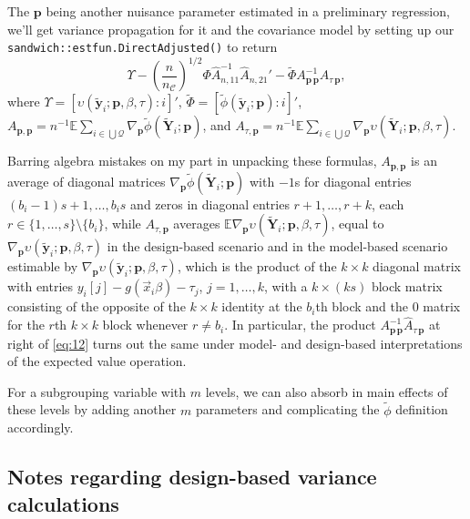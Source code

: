 \documentclass{article}
\begin{document}
The $\mathbf{p}$ being another nuisance parameter estimated in a
preliminary regression, we'll get variance propagation for it and the
covariance model by setting up our
\texttt{sandwich::estfun.DirectAdjusted()} to return
\begin{equation}\label{eq:12}
  \Upsilon -
  \left(\frac{n}{n_{\mathcal{C}}}\right)^{1/2}\Phi
  \hat{A}_{n,11}^{-1}\hat{A}_{n,21}' - \tilde{\Phi}
  A_{\mathbf{p}\,\mathbf{p}}^{-1}\hat{A}_{\tau\,\mathbf{p}}, 
\end{equation}
where $\Upsilon =
[\upsilon(\tilde{\mathbf{y}}_{i}; \mathbf{p}, \beta, \tau) : i]'$,
$\tilde{\Phi}= [\tilde{\phi}(\tilde{\mathbf{y}}_{i}; \mathbf{p}): i]'$, 
$A_{\mathbf{p}, \mathbf{p}} = n^{-1}\mathbb{E} \sum_{i\in \bigcup
  \mathcal{Q}}\nabla_{\mathbf{p}}\tilde{\phi}(\tilde{\mathbf{Y}}_{i};
\mathbf{p})$, and $A_{\tau, \mathbf{p}} = n^{-1}\mathbb{E} \sum_{i\in \bigcup
  \mathcal{Q}}\nabla_{\mathbf{p}}\upsilon(\tilde{\mathbf{Y}}_{i};
\mathbf{p}, \beta, \tau)$.

Barring algebra mistakes on my part in unpacking these formulas, $A_{\mathbf{p}, \mathbf{p}}$ is
an average of diagonal matrices $\nabla_{\mathbf{p}}\tilde{\phi}(\tilde{\mathbf{Y}}_{i};
\mathbf{p})$ with $-1$s for diagonal entries $(b_{i}-1)s+1, \ldots,
b_{i}s$ and zeros in diagonal entries $r+1, \ldots, r+k$, each
$r \in \{1, \ldots, s\}\setminus \{b_{i}\}$, while $A_{\tau,
  \mathbf{p}}$ averages $\mathbb{E} \nabla_{\mathbf{p}}\upsilon(\tilde{\mathbf{Y}}_{i};
\mathbf{p}, \beta, \tau)$, equal to $\nabla_{\mathbf{p}}\upsilon(\tilde{\mathbf{y}}_{i};
\mathbf{p}, \beta, \tau)$ in the design-based scenario and in the
model-based scenario estimable by $\nabla_{\mathbf{p}}\upsilon(\tilde{\mathbf{y}}_{i};
\mathbf{p}, \beta, \tau)$, which is the product of the $k \times k$
diagonal matrix with entries $y_{i}[j] - g(\vec{x}_{i}\beta) -
\tau_{j}$, $j=1, \ldots, k$, with a $k \times (ks)$ block matrix
consisting of the opposite of the $k\times k$ identity at the
$b_{i}$th block and the 0 matrix for the $r$th $k \times k$ block whenever
$r\neq b_{i}$.  In particular, the product
$A_{\mathbf{p}\,\mathbf{p}}^{-1}\hat{A}_{\tau\,\mathbf{p}}$ at right
of \eqref{eq:12} turns out the same under model- and design-based
interpretations of the expected value operation.

For a subgrouping variable with $m$ levels,
we can also absorb in main effects of these levels by adding another
$m$ parameters and complicating the $\tilde{\phi}$ definition accordingly. 


\subsection{Notes regarding design-based variance calculations}
\end{document}
